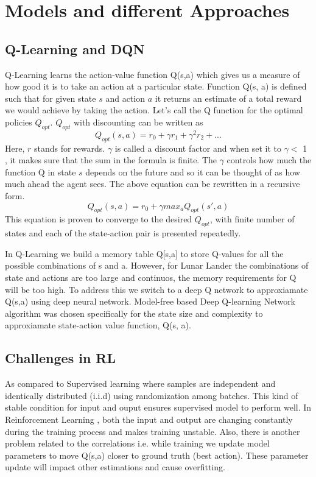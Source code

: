 \section{Models and different Approaches}
\subsection{Q-Learning and DQN }
Q-Learning learns the action-value function Q(s,a) which gives us a measure of how good it is to take an action at a particular state. Function Q(s, a) is defined such that for given state $s$ and action $a$ it returns an estimate of a total reward we would achieve by taking the action. Let’s call the Q function for the optimal policies $Q_{opt}$.
 $Q_{opt}$ with discounting can be written as 
 \begin{equation}
Q_{opt}(s,a) = r_{0} + \gamma r_{1} + \gamma^{2} r_{2} + ...
\end{equation}
Here, $r$ stands for rewards. $\gamma$ is called a discount factor and when set it to $\gamma < $  1 , it makes sure that the sum in the formula is finite. The $\gamma$ controls how much the function Q in state $s$ depends on the future and so it can be thought of as how much ahead the agent sees.  \newline
The above equation can be rewritten in a recursive form.
 \begin{equation}
Q_{opt}(s,a) = r_{0} + \gamma max_{a}Q_{opt}(s',a)
\end{equation}
This equation is proven to converge to the desired $Q_{opt}$, with finite number of states and each of the state-action pair is presented repeatedly.

In Q-Learning we build a memory table Q[s,a] to store Q-values for all the possible combinations of s and a. However, for Lunar Lander the combinations of state and actions are too large and continuos, the memory requirements for Q will be too high. To address this we switch to a deep Q network to approxiamate Q(s,a) using deep neural network.
Model-free based Deep Q-learning Network algorithm was chosen specifically for the state size and complexity to approxiamate state-action value function, Q(s, a).
\newline 

\subsection{Challenges in RL }
As compared to Supervised learning where samples are independent and identically distributed (i.i.d) using randomization among batches. This kind of stable condition for input and ouput ensures supervised model to perform well. In Reinforcement Learning , both the input and output are changing constantly during the training process and makes training unstable. Also, there is another problem related to the correlations i.e. while training we update model parameters to move Q(s,a) closer to ground truth (best action).  These parameter update will impact other estimations and cause overfitting.


